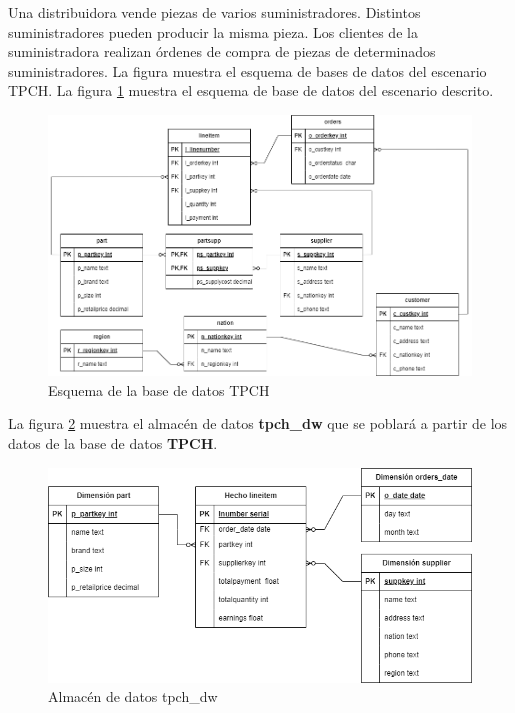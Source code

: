 Una distribuidora vende piezas de varios suministradores. Distintos suministradores pueden 
producir la misma pieza. Los clientes de la suministradora realizan \'ordenes de compra 
de piezas de determinados suministradores. La figura  muestra el esquema de bases de datos 
del escenario TPCH. La figura \ref{fig:transactionaltpch} muestra el esquema de base de datos 
del escenario descrito.

\begin{figure}
  \centering
  \includegraphics[scale=0.5]{Graphics/tpch-tpch-transactional.drawio (4).png}
  \caption{Esquema de la base de datos TPCH}
  \label{fig:transactionaltpch}
\end{figure}

La figura \ref{fig:warehousetpch} muestra el almacén de datos \textbf{tpch\_dw} que se poblar\'a a partir de los 
datos de la base de datos \textbf{TPCH}.

\begin{figure}
  \centering
  \includegraphics[scale=0.5]{Graphics/tpch-tpch-warehouse.drawio.png}
  \caption{Almacén de datos tpch\_dw}
  \label{fig:warehousetpch}
\end{figure}

